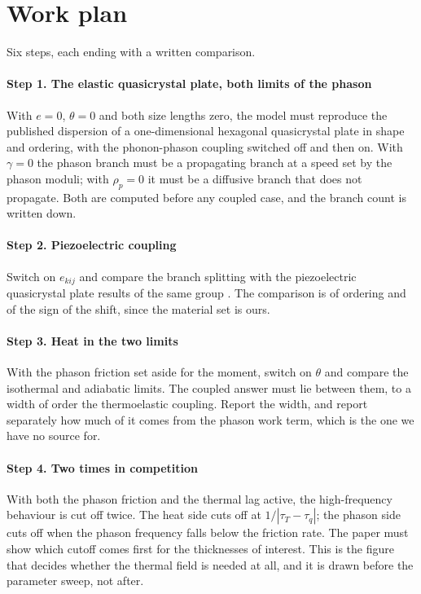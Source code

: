 \documentclass[11pt]{article}
\begin{document}
\section{Work plan}

Six steps, each ending with a written comparison.

\paragraph{Step 1. The elastic quasicrystal plate, both limits of the phason} With $e=0$, $\theta=0$ and both
size lengths zero, the model must reproduce the published dispersion of a one-dimensional hexagonal
quasicrystal plate \cite{Zhang2021} in shape and ordering, with the phonon-phason coupling switched off and
then on. With $\gamma=0$ the phason branch must be a propagating branch at a speed set by the phason moduli;
with $\rho_p=0$ it must be a diffusive branch that does not propagate. Both are computed before any coupled
case, and the branch count is written down.

\paragraph{Step 2. Piezoelectric coupling} Switch on $e_{kij}$ and compare the branch splitting with the
piezoelectric quasicrystal plate results of the same group \cite{Wang2025,Wang2022}. The comparison is of
ordering and of the sign of the shift, since the material set is ours.

\paragraph{Step 3. Heat in the two limits} With the phason friction set aside for the moment, switch on $\theta$ and
compare the isothermal and adiabatic limits. The coupled answer must lie between them, to a width of order
the thermoelastic coupling. Report the width, and report separately how much of it comes from the phason
work term, which is the one we have no source for.

\paragraph{Step 4. Two times in competition} With both the phason friction and the thermal lag active, the
high-frequency behaviour is cut off twice. The heat side cuts off at $1/|\tau_T-\tau_q|$; the phason side
cuts off when the phason frequency falls below the friction rate. The paper must show which cutoff comes
first for the thicknesses of interest. This is the figure that decides whether the thermal field is needed at
all, and it is drawn before the parameter sweep, not after.
\end{document}

